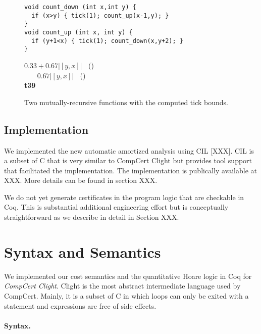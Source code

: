 \documentclass[nocopyrightspace,preprint]{sigplanconf}
\begin{document}
\begin{figure}[t]
  \centering
    \begin{minipage}[b]{\linewidth}
    \begin{center}
   \begin{lstlisting}
void count_down (int x,int y) {
  if (x>y) { tick(1); count_up(x-1,y); }
}
void count_up (int x, int y) {
  if (y+1<x) { tick(1); count_down(x,y+2); }
}
   \end{lstlisting}

$0.33 + 0.67 |[y,x]|\;\;$ ()\\
$\;\;\;\;\;\;\,0.67 |[y,x]|\;\;$ ()
\\[.7\baselineskip]
      {\bf t39}
    \end{center}
  \end{minipage}
  \caption{Two mutually-recursive functions with the computed tick bounds.}
  \label{fig:ex_rec}
\end{figure}

\subsection{Implementation}

We implemented the new automatic amortized analysis using CIL [XXX].
CIL is a subset of C that is very similar to CompCert Clight but
provides tool support that facilitated the implementation.  The
implementation is publically available at XXX.  More details can be
found in section XXX.

We do not yet generate certificates in the program logic that are
checkable in Coq.  This is substantial additional engineering effort
but is conceptually straightforward as we describe in detail in
Section XXX.


\section{Syntax and Semantics}
\label{sec:sem}

We implemented our cost semantics and the quantitative Hoare logic in
Coq for \emph{CompCert Clight}.  Clight is the most abstract
intermediate language used by CompCert.  Mainly, it is a subset of C
in which loops can only be exited with a  statement and
expressions are free of side effects.

\paragraph{Syntax.}
\end{document}
